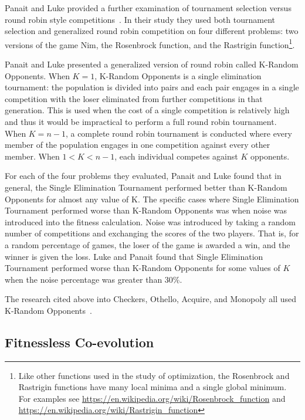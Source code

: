 Panait and Luke provided a further examination of tournament selection versus
round robin style competitions~\cite{Panait02acomparative}. In their study they
used both tournament selection and generalized round robin competition on four
different problems: two versions of the game Nim, the Rosenbrock function, and
the Rastrigin function\footnote{Like other functions used in the study of
optimization, the Rosenbrock and Rastrigin functions have many local minima and
a single global minimum. For examples see
\url{https://en.wikipedia.org/wiki/Rosenbrock_function} and
\url{https://en.wikipedia.org/wiki/Rastrigin_function}}.

Panait and Luke presented a generalized version of round robin called K-Random
Opponents. When \(K=1\), K-Random Opponents is a single elimination tournament:
the population is divided into pairs and each pair engages in a single
competition with the loser eliminated from further competitions in that
generation. This is used when the cost of a single competition is relatively
high and thus it would be impractical to perform a full round robin tournament.
When \(K=n-1\), a complete round robin tournament is conducted where every
member of the population engages in one competition against every other member.
When \(1 < K < n-1\), each individual competes against \(K\) opponents.

For each of the four problems they evaluated, Panait and Luke found that in
general, the Single Elimination Tournament performed better than K-Random
Opponents for almost any value of K. The specific cases where Single Elimination
Tournament performed worse than K-Random Opponents was when noise was introduced
into the fitness calculation. Noise was introduced by taking a random number of
competitions and exchanging the scores of the two players. That is, for a random
percentage of games, the loser of the game is awarded a win, and the winner is
given the loss. Luke and Panait found that Single Elimination Tournament
performed worse than K-Random Opponents for some values of \(K\) when the noise
percentage was greater than 30\%.

The research cited above into Checkers, Othello, Acquire, and Monopoly all used
K-Random
Opponents~\cite{Fogel2000Anaconda,journals/tec/ChellapillaF01,ChongTW05,Anthony2002,DBLP:conf/cig/Frayn05}.

\subsection{Fitnessless Co-evolution}

